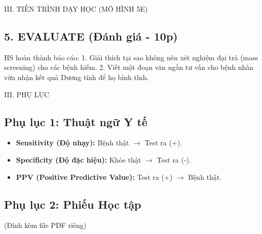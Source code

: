 \documentclass[12pt,a4paper]{article}
\begin{document}
\begin{sectionbox}{III. TIẾN TRÌNH DẠY HỌC (MÔ HÌNH 5E)}
\subsection*{5. EVALUATE (Đánh giá - 10p)}
HS hoàn thành báo cáo:
1. Giải thích tại sao không nên xét nghiệm đại trà (mass screening) cho các bệnh hiếm.
2. Viết một đoạn văn ngắn tư vấn cho bệnh nhân vừa nhận kết quả Dương tính để họ bình tĩnh.
\end{sectionbox}

\newpage
\begin{sectionbox}{III. PHỤ LỤC}
\subsection*{Phụ lục 1: Thuật ngữ Y tế}
\begin{itemize}
    \item \textbf{Sensitivity (Độ nhạy):} Bệnh thật $\to$ Test ra (+).
    \item \textbf{Specificity (Độ đặc hiệu):} Khỏe thật $\to$ Test ra (-).
    \item \textbf{PPV (Positive Predictive Value):} Test ra (+) $\to$ Bệnh thật.
\end{itemize}

\subsection*{Phụ lục 2: Phiếu Học tập}
(Đính kèm file PDF riêng)
\end{sectionbox}
\end{document}
